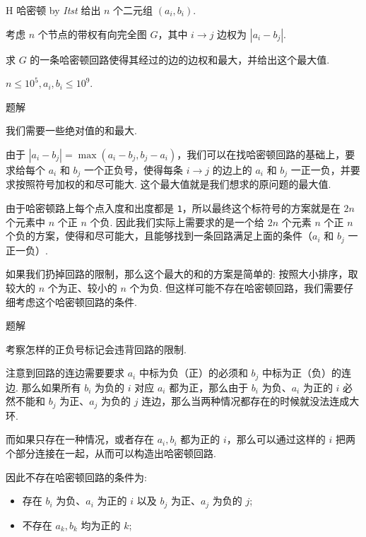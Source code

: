 \begin{frame}{H 哈密顿 {by \itshape Itst}}
	给出 $n$ 个二元组 $(a_i,b_i)$.

	考虑 $n$ 个节点的带权有向完全图 $G$，其中 $i\rightarrow j$ 边权为 $|a_i-b_j|$.

	求 $G$ 的一条哈密顿回路使得其经过的边的边权和最大，并给出这个最大值.

	$n\le 10^5, a_i,b_i\le 10^9$.

\end{frame}

\begin{frame}{题解}
	
	我们需要一些绝对值的和最大. \pause

	由于 $|a_i-b_j|=\max(a_i-b_j,b_j-a_i)$，我们可以在找哈密顿回路的基础上，要求给每个 $a_i$ 和 $b_j$ 一个正负号，使得每条 $i\rightarrow j$ 的边上的 $a_i$ 和 $b_j$ 一正一负，并要求按照符号加权的和尽可能大. 这个最大值就是我们想求的原问题的最大值. \pause

	由于哈密顿路上每个点入度和出度都是 \texttt{1}，所以最终这个标符号的方案就是在 $2n$ 个元素中 $n$ 个正 $n$ 个负. 因此我们实际上需要求的是一个给 $2n$ 个元素 $n$ 个正 $n$ 个负的方案，使得和尽可能大，且能够找到一条回路满足上面的条件（$a_i$ 和 $b_j$ 一正一负）. \pause

	如果我们扔掉回路的限制，那么这个最大的和的方案是简单的: 按照大小排序，取较大的 $n$ 个为正、较小的 $n$ 个为负. 但这样可能不存在哈密顿回路，我们需要仔细考虑这个哈密顿回路的条件.

\end{frame}

\begin{frame}{题解}

	考察怎样的正负号标记会违背回路的限制. \pause

	注意到回路的连边需要要求 $a_i$ 中标为负（正）的必须和 $b_j$ 中标为正（负）的连边. 那么如果所有 $b_i$ 为负的 $i$ 对应 $a_i$ 都为正，那么由于 $b_i$ 为负、$a_i$ 为正的 $i$ 必然不能和 $b_j$ 为正、$a_j$ 为负的 $j$ 连边，那么当两种情况都存在的时候就没法连成大环. \pause

	而如果只存在一种情况，或者存在 $a_i,b_i$ 都为正的 $i$，那么可以通过这样的 $i$ 把两个部分连接在一起，从而可以构造出哈密顿回路. \pause

	因此不存在哈密顿回路的条件为: \pause
	\begin{itemize}
	\item 存在 $b_i$ 为负、$a_i$ 为正的 $i$ 以及 $b_j$ 为正、$a_j$ 为负的 $j$; \pause
	\item 不存在 $a_k,b_k$ 均为正的 $k$;
	\end{itemize}

\end{frame}

